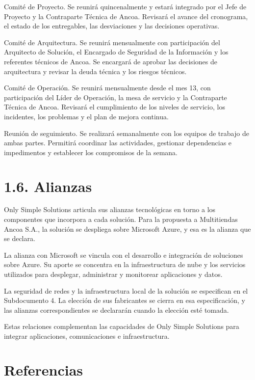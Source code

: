 \documentclass[11pt]{article}
\begin{document}
Comité de Proyecto. Se reunirá quincenalmente y estará integrado por el Jefe de Proyecto y la Contraparte Técnica de Ancoa. Revisará el avance del cronograma, el estado de los entregables, las desviaciones y las decisiones operativas.

Comité de Arquitectura. Se reunirá mensualmente con participación del Arquitecto de Solución, el Encargado de Seguridad de la Información y los referentes técnicos de Ancoa. Se encargará de aprobar las decisiones de arquitectura y revisar la deuda técnica y los riesgos técnicos.

Comité de Operación. Se reunirá mensualmente desde el mes 13, con participación del Líder de Operación, la mesa de servicio y la Contraparte Técnica de Ancoa. Revisará el cumplimiento de los niveles de servicio, los incidentes, los problemas y el plan de mejora continua.

Reunión de seguimiento. Se realizará semanalmente con los equipos de trabajo de ambas partes. Permitirá coordinar las actividades, gestionar dependencias e impedimentos y establecer los compromisos de la semana.

\section{1.6. Alianzas}\label{alianzas}

Only Simple Solutions articula sus alianzas tecnológicas en torno a los componentes que incorpora a cada solución. Para la propuesta a Multitiendas Ancoa S.A., la solución se despliega sobre Microsoft Azure, y esa es la alianza que se declara.

La alianza con Microsoft se vincula con el desarrollo e integración de soluciones sobre Azure. Su aporte se concentra en la infraestructura de nube y los servicios utilizados para desplegar, administrar y monitorear aplicaciones y datos.

La seguridad de redes y la infraestructura local de la solución se especifican en el Subdocumento 4. La elección de sus fabricantes se cierra en esa especificación, y las alianzas correspondientes se declararán cuando la elección esté tomada.

Estas relaciones complementan las capacidades de Only Simple Solutions para integrar aplicaciones, comunicaciones e infraestructura.

\section*{Referencias}
\end{document}
